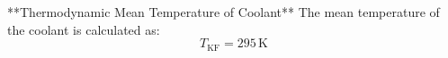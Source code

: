 **Thermodynamic Mean Temperature of Coolant**  
The mean temperature of the coolant is calculated as:  
\[
T_{\text{KF}} = 295 \, \text{K}
\]
